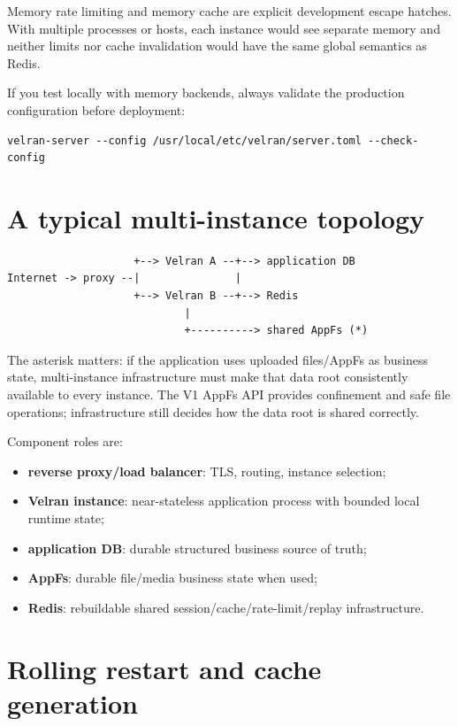 Memory rate limiting and memory cache are explicit development escape hatches. With multiple processes or hosts, each instance would see separate memory and neither limits nor cache invalidation would have the same global semantics as Redis.

If you test locally with memory backends, always validate the production configuration before deployment:

\begin{lstlisting}
velran-server --config /usr/local/etc/velran/server.toml --check-config
\end{lstlisting}

\section{A typical multi-instance topology}

\begin{lstlisting}
                    +--> Velran A --+--> application DB
Internet -> proxy --|               |
                    +--> Velran B --+--> Redis
                            |
                            +----------> shared AppFs (*)
\end{lstlisting}

The asterisk matters: if the application uses uploaded files/AppFs as business state, multi-instance infrastructure must make that data root consistently available to every instance. The V1 AppFs API provides confinement and safe file operations; infrastructure still decides how the data root is shared correctly.

Component roles are:

\begin{itemize}
  \item \textbf{reverse proxy/load balancer}: TLS, routing, instance selection;
  \item \textbf{Velran instance}: near-stateless application process with bounded local runtime state;
  \item \textbf{application DB}: durable structured business source of truth;
  \item \textbf{AppFs}: durable file/media business state when used;
  \item \textbf{Redis}: rebuildable shared session/cache/rate-limit/replay infrastructure.
\end{itemize}

\section{Rolling restart and cache generation}

